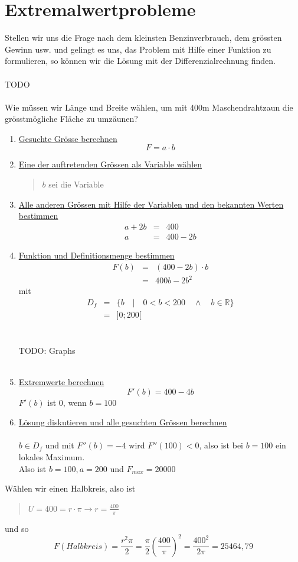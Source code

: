 \documentclass{report}
\begin{document}
\section{Extremalwertprobleme}
Stellen wir uns die Frage nach dem kleinsten Benzinverbrauch, dem grössten Gewinn usw. und gelingt es uns, das Problem mit Hilfe einer Funktion zu formulieren, so können wir die Lösung mit der Differenzialrechnung finden.
\\\\TODO\\\\
Wie müssen wir Länge und Breite wählen, um mit 400m Maschendrahtzaun die grösstmögliche Fläche zu umzäunen?
\begin{enumerate}
\item \underline{Gesuchte Grösse berechnen}
\begin{equation}F = a \cdot b\end{equation}
\item \underline{Eine der auftretenden Grössen als Variable wählen}
\begin{quote}$b$ sei die Variable\end{quote}
\item \underline{Alle anderen Grössen mit Hilfe der Variablen und den bekannten Werten bestimmen}
\begin{eqnarray}a + 2b & = & 400 \nonumber \\
a & = & 400 - 2b\end{eqnarray}
\item \underline{Funktion und Definitionsmenge bestimmen}
\begin{eqnarray}F(b) & = & (400 - 2b) \cdot b\nonumber \\
& = & 400b - 2b^2\end{eqnarray}
mit
\begin{eqnarray}D_f & = & \{ b \quad | \quad 0 < b < 200 \quad \land \quad b \in \mathbb{R}\}\nonumber \\
& = & ]0;200[\end{eqnarray}
\\\\TODO: Graphs\\\\
\item \underline{Extremwerte berechnen}
\begin{equation}F'(b) = 400- 4b\end{equation}
$F'(b)$ ist $0$, wenn $b = 100$
\item \underline{Lösung diskutieren und alle gesuchten Grössen berechnen}
\\\\$b \in D_f$ und mit $F''(b) = -4$ wird $F''(100) < 0$, also ist bei $b = 100$ ein lokales Maximum.\\
Also ist $b=100, a=200$ und $F_{max} = 20000$
\end{enumerate}
Wählen wir einen Halbkreis, also ist
\begin{quote}$U = 400 = r \cdot \pi \rightarrow r = \frac{400}{\pi}$\end{quote}
und so
\begin{equation}F(Halbkreis) = \frac{r^2 \pi}{2} = \frac{\pi}{2}(\frac{400}{\pi})^2 = \frac{400^2}{2 \pi} = 25464,79\end{equation}
\end{document}
